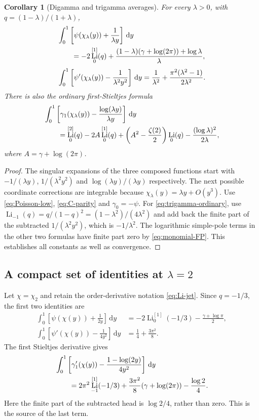 \documentclass[11pt]{article}
\newtheorem{corollary}[theorem]{Corollary}
\theoremstyle{definition}\newtheorem{definition}[theorem]{Definition}
\theoremstyle{remark}\newtheorem{remark}[theorem]{Remark}
\DeclareMathOperator{\Li}{Li}
\newcommand{\dd}{\,\mathrm d}
\newcommand{\LiJ}[2]{\Li_{#1}^{[#2]}}
\begin{document}
\begin{corollary}[Digamma and trigamma averages]\label{cor:ordinary}
For every $\lambda>0$, with $q=(1-\lambda)/(1+\lambda)$,
\begin{align}\label{eq:digamma-ordinary}
&\int_0^1\left[\psi(\chi_\lambda(y))+\frac1{\lambda y}\right]\dd y\\
&\qquad=-2\LiJ{0}{1}(q)
+\frac{(1-\lambda)(\gamma+\log(2\pi))+\log\lambda}{\lambda},\notag\\[3pt]
&\int_0^1\left[\psi'(\chi_\lambda(y))-\frac1{\lambda^2y^2}\right]\dd y
=\frac1{\lambda^2}+\frac{\pi^2(\lambda^2-1)}{2\lambda^2}.\label{eq:trigamma-ordinary}
\end{align}
There is also the ordinary first-Stieltjes formula
\begin{align}\label{eq:gamma1-ordinary}
&\int_0^1\left[\gamma_1(\chi_\lambda(y))-
\frac{\log(\lambda y)}{\lambda y}\right]\dd y\\
&\qquad=\LiJ{0}{2}(q)-2A\LiJ{0}{1}(q)
+\left(A^2-\frac{\zeta(2)}2\right)\Li_0(q)
-\frac{(\log\lambda)^2}{2\lambda},\notag
\end{align}
where $A=\gamma+\log(2\pi)$.
\end{corollary}
\begin{proof}
The singular expansions of the three composed functions start with
$-1/(\lambda y)$, $1/(\lambda^2y^2)$ and
$\log(\lambda y)/(\lambda y)$ respectively. The next possible coordinate corrections are integrable because $\chi_\lambda(y)=\lambda y+O(y^3)$.
Use \eqref{eq:Poisson-low}, \eqref{eq:C-parity} and $\gamma_0=-\psi$. For \eqref{eq:trigamma-ordinary}, use
$\Li_{-1}(q)=q/(1-q)^2=(1-\lambda^2)/(4\lambda^2)$
and add back the finite part of the subtracted $1/(\lambda^2y^2)$, which is $-1/\lambda^2$. The logarithmic simple-pole terms in the other two formulas have finite part zero by \eqref{eq:monomial-FP}. This establishes all constants as well as convergence.
\end{proof}

\subsection{A compact set of identities at $\lambda=2$}
Let $\chi=\chi_2$ and retain the order-derivative notation \eqref{eq:Li-jet}. Since $q=-1/3$, the first two identities are
\begin{align}\label{eq:lambda2-digamma}
\int_0^1\left[\psi(\chi(y))+\frac1{2y}\right]\dd y
&=-2\LiJ{0}{1}(-1/3)-\frac{\gamma+\log\pi}{2},\\
\int_0^1\left[\psi'(\chi(y))-\frac1{4y^2}\right]\dd y
&=\frac14+\frac{3\pi^2}{8}.\label{eq:lambda2-trigamma}
\end{align}
The first Stieltjes derivative gives
\begin{align}\label{eq:lambda2-stieltjes}
&\int_0^1\left[\gamma_1'(\chi(y))-
\frac{1-\log(2y)}{4y^2}\right]\dd y\\
&\qquad=2\pi^2\LiJ{-1}{1}(-1/3)
+\frac{3\pi^2}{8}(\gamma+\log(2\pi))-\frac{\log2}{4}.\notag
\end{align}
Here the finite part of the subtracted head is $\log2/4$, rather than zero. This is the source of the last term.
\end{document}
